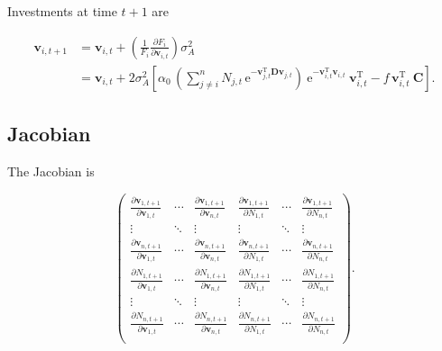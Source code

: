 Investments at time $t+1$ are

\begin{equation} \label{eq:matrix-invest-change}
\begin{split}
    \mathbf{v}_{i,t+1} &= \mathbf{v}_{i,t} + \left( \frac{1}{F_i}
        \frac{\partial F_i}{\partial \mathbf{v}_{i,t}} \right) \sigma^2_A \\
     &= \mathbf{v}_{i,t} + 2 \sigma_A^2
    \left[
        \alpha_0 \, \left(
            \sum_{j \ne i}^{n}{ N_{j,t} \, \textrm{e}^{
            - \mathbf{v}_{j,t}^{\textrm{T}}
            \mathbf{D} \mathbf{v}_{j,t} } }
        \right) \:
            \textrm{e}^{- \mathbf{v}_{i,t}^{\textrm{T}} \mathbf{v}_{i,t}} \:
            \mathbf{v}_{i,t}^{\textrm{T}}
        - f \, \mathbf{v}_{i,t}^{\textrm{T}} \: \mathbf{C}
    \right]
    \textrm{.}
\end{split}
\end{equation}







\subsection*{Jacobian}

The Jacobian is

\begin{equation} \label{eq:jacobian}
    \begin{pmatrix}
        \frac{\partial \mathbf{v}_{1,t+1}}{\partial \mathbf{v}_{1,t}} & \cdots &
            \frac{\partial \mathbf{v}_{1,t+1}}{\partial \mathbf{v}_{n,t}} &
            \frac{\partial \mathbf{v}_{1,t+1}}{\partial N_{1,t}} & \cdots &
            \frac{\partial \mathbf{v}_{1,t+1}}{\partial N_{n,t}} \\
        \vdots & \ddots & \vdots & \vdots & \ddots & \vdots \\
        \frac{\partial \mathbf{v}_{n,t+1}}{\partial \mathbf{v}_{1,t}} & \cdots &
            \frac{\partial \mathbf{v}_{n,t+1}}{\partial \mathbf{v}_{n,t}} &
            \frac{\partial \mathbf{v}_{n,t+1}}{\partial N_{1,t}} & \cdots &
            \frac{\partial \mathbf{v}_{n,t+1}}{\partial N_{n,t}} \\[1ex]
%
%
        \frac{\partial N_{1,t+1}}{\partial \mathbf{v}_{1,t}} & \cdots &
            \frac{\partial N_{1,t+1}}{\partial \mathbf{v}_{n,t}} &
            \frac{\partial N_{1,t+1}}{\partial N_{1,t}} & \cdots &
            \frac{\partial N_{1,t+1}}{\partial N_{n,t}} \\
        \vdots & \ddots & \vdots & \vdots & \ddots & \vdots \\
        \frac{\partial N_{n,t+1}}{\partial \mathbf{v}_{1,t}} & \cdots &
            \frac{\partial N_{n,t+1}}{\partial \mathbf{v}_{n,t}} &
            \frac{\partial N_{n,t+1}}{\partial N_{1,t}} & \cdots &
            \frac{\partial N_{n,t+1}}{\partial N_{n,t}} \\
    \end{pmatrix}
    \text{.}
\end{equation}


